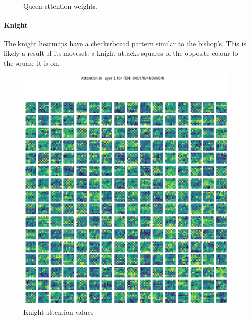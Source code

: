 \begin{figure}[H]
\begin{minipage}{0.475\textwidth}
    \caption{Queen attention weights.}
    \label{atnQ1}
  \end{minipage}
\end{figure}


\paragraph{Knight} The knight heatmaps have a checkerboard pattern similar to
the bishop's. This is likely a result of its moveset: a knight attacks
squares of the opposite colour to the square it is on.

\begin{figure}[H]
  \begin{minipage}{0.475\textwidth}
    \centering
    \includegraphics[width=\textwidth]{project/img/attention_maps/N_attention_1.png}
    \caption{Knight attention values.}
    \label{atnN}
  \end{minipage}
  \hspace{0.05\textwidth}
  \begin{minipage}{0.475\textwidth}
    \centering

\end{minipage}
\end{figure}
